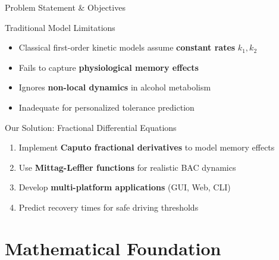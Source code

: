 \documentclass[aspectratio=169,14pt]{beamer}
\newcommand{\highlight}[1]{\textcolor{kentech_orange}{\textbf{#1}}}
\begin{document}
\begin{frame}{Problem Statement \& Objectives}
    \begin{block}{Traditional Model Limitations}
        \begin{itemize}
            \item Classical first-order kinetic models assume \highlight{constant rates} $k_1, k_2$
            \item Fails to capture \highlight{physiological memory effects}
            \item Ignores \highlight{non-local dynamics} in alcohol metabolism
            \item Inadequate for personalized tolerance prediction
        \end{itemize}
    \end{block}
    
    \vspace{0.5cm}
    
    \begin{block}{Our Solution: Fractional Differential Equations}
        \begin{enumerate}
            \item Implement \highlight{Caputo fractional derivatives} to model memory effects
            \item Use \highlight{Mittag-Leffler functions} for realistic BAC dynamics
            \item Develop \highlight{multi-platform applications} (GUI, Web, CLI)
            \item Predict recovery times for safe driving thresholds
        \end{enumerate}
    \end{block}
\end{frame}

\section{Mathematical Foundation}
\end{document}

